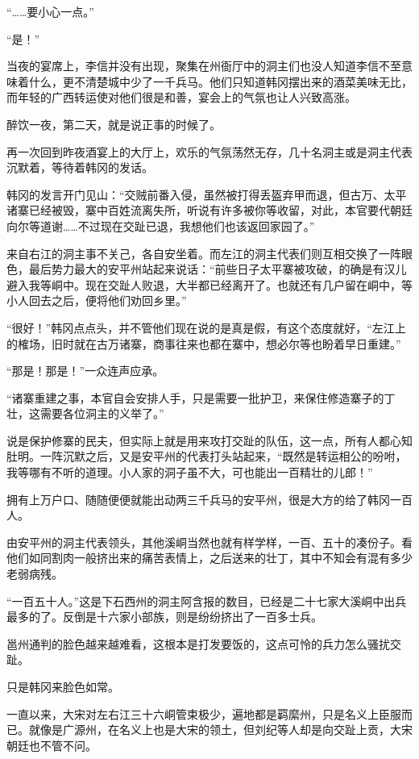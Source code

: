 “……要小心一点。”

“是！”

当夜的宴席上，李信并没有出现，聚集在州衙厅中的洞主们也没人知道李信不至意味着什么，更不清楚城中少了一千兵马。他们只知道韩冈摆出来的酒菜美味无比，而年轻的广西转运使对他们很是和善，宴会上的气氛也让人兴致高涨。

醉饮一夜，第二天，就是说正事的时候了。

再一次回到昨夜酒宴上的大厅上，欢乐的气氛荡然无存，几十名洞主或是洞主代表沉默着，等待着韩冈的发话。

韩冈的发言开门见山：“交贼前番入侵，虽然被打得丢盔弃甲而退，但古万、太平诸寨已经被毁，寨中百姓流离失所，听说有许多被你等收留，对此，本官要代朝廷向尔等道谢……不过现在交趾已退，我想他们也该返回家园了。”

来自右江的洞主事不关己，各自安坐着。而左江的洞主代表们则互相交换了一阵眼色，最后势力最大的安平州站起来说话：“前些日子太平寨被攻破，的确是有汉儿避入我等峒中。现在交趾人败退，大半都已经离开了。也就还有几户留在峒中，等小人回去之后，便将他们劝回乡里。”

“很好！”韩冈点点头，并不管他们现在说的是真是假，有这个态度就好，“左江上的榷场，旧时就在古万诸寨，商事往来也都在寨中，想必尔等也盼着早日重建。”

“那是！那是！”一众连声应承。

“诸寨重建之事，本官自会安排人手，只是需要一批护卫，来保住修造寨子的丁壮，这需要各位洞主的义举了。”

说是保护修寨的民夫，但实际上就是用来攻打交趾的队伍，这一点，所有人都心知肚明。一阵沉默之后，又是安平州的代表打头站起来，“既然是转运相公的吩咐，我等哪有不听的道理。小人家的洞子虽不大，可也能出一百精壮的儿郎！”

拥有上万户口、随随便便就能出动两三千兵马的安平州，很是大方的给了韩冈一百人。

由安平州的洞主代表领头，其他溪峒当然也就有样学样，一百、五十的凑份子。看他们如同割肉一般挤出来的痛苦表情上，之后送来的壮丁，其中不知会有混有多少老弱病残。

“一百五十人。”这是下石西州的洞主阿含报的数目，已经是二十七家大溪峒中出兵最多的了。反倒是十六家小部族，则是纷纷挤出了一百多士兵。

邕州通判的脸色越来越难看，这根本是打发要饭的，这点可怜的兵力怎么骚扰交趾。

只是韩冈来脸色如常。

一直以来，大宋对左右江三十六峒管束极少，遍地都是羁縻州，只是名义上臣服而已。就像是广源州，在名义上也是大宋的领土，但刘纪等人却是向交趾上贡，大宋朝廷也不管不问。

